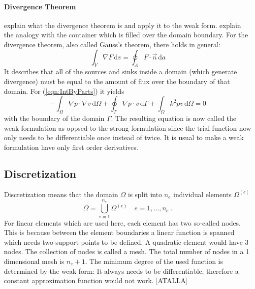 \documentclass[%
  a4paper,oneside,%
  11pt,%
  smallchapters,
  green,%
  rgb, <cmyk>
  ,]{tubsbook}
\begin{document}
\paragraph{Divergence Theorem}
explain what the divergence theorem is and apply it to the  weak form. explain the analogy with the container which is filled over the domain boundary.
For the divergence theorem, also called Gauss's theorem, there holds in general:
\begin{equation}
\int_{V}  \nabla F \,\mathrm{d}v = \oint_A F \cdot \vec{n} \,\mathrm{d}a
\end{equation}
It describes that all of the sources and sinks inside a domain (which generate divergence) must be equal to the amount of flux over the boundary of that domain.
For (\ref{eqn:IntByParts}) it yields
\begin{equation}
-\int_{\Omega} \nabla p \cdot \nabla v \,\mathrm{d}\Omega + \oint_{\Gamma} \nabla p \cdot v \,\mathrm{d}\Gamma+ \int_{\Omega} k^2 pv \,\mathrm{d}\Omega = 0
\end{equation}
with the boundary of the domain $\Gamma$.
The resulting equation is now called the weak formulation as oppsed to the strong formulation since the trial function now only needs to be differentiable once instead of twice. It is usual to make a weak formulation have only first order derivatives.

\subsection{Discretization}

Discretization means that the domain $\Omega$ is split into $n_e$ individual elements $\Omega^{(e)}$
\begin{equation}
\Omega = \bigcup_{e=1}^{n_e} \Omega^{(e)} \quad e = 1,...,n_e \;.
\end{equation}
For linear elements which are used here, each element has two so-called nodes. This is because between the element boundaries a linear function is spanned which needs two support points to be defined.  A quadratic element would have 3 nodes. The collection of nodes is called a mesh. The total number of nodes in a 1 dimensional mesh is $n_e + 1$. The minimum degree of the used function is determined by the weak form: It always needs to be differentiable, therefore a constant approximation function would not work. [ATALLA]
\end{document}
